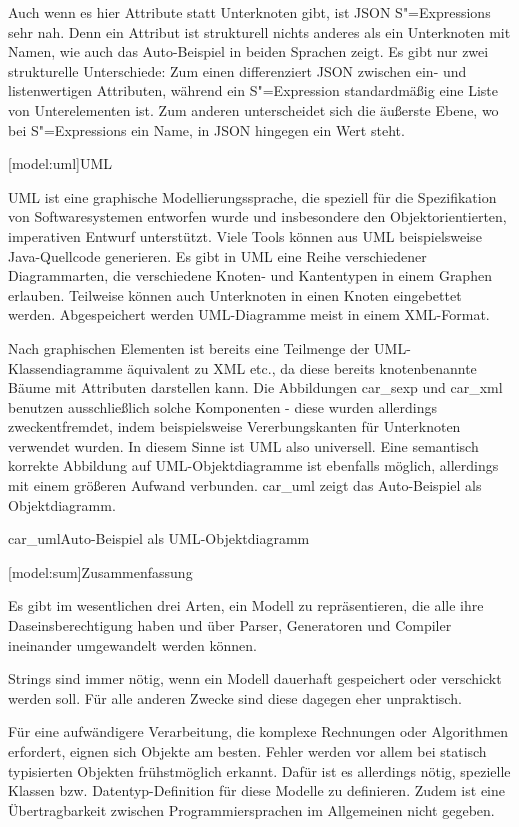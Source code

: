 \documentclass[11pt, a4paper, bibgerm]{book}
\newcommand\lsection{}
\newcommand\fref{}
\newcommand\abb{}
\newcommand\fig{}
\newcommand{\sexp}{S"=Expression}
\newcommand{\sexps}{S"=Expressions}
\begin{document}
Auch wenn es hier Attribute statt Unterknoten gibt, ist JSON \sexps{}
sehr nah. Denn ein Attribut ist strukturell nichts anderes als ein
Unterknoten mit Namen, wie auch das Auto-Beispiel in beiden Sprachen
zeigt. Es gibt nur zwei strukturelle Unterschiede: Zum einen
differenziert JSON zwischen ein- und listenwertigen Attributen, während
ein \sexp{} standardmäßig eine Liste von Unterelementen ist. Zum anderen
unterscheidet sich die äußerste Ebene, wo bei \sexps{} ein Name, in JSON
hingegen ein Wert steht.

\lsection[model:uml]{UML}

UML ist eine graphische Modellierungssprache, die speziell für die
Spezifikation von Softwaresystemen entworfen wurde und insbesondere den
Objektorientierten, imperativen Entwurf unterstützt. Viele Tools können
aus UML beispielsweise Java-Quellcode generieren. Es gibt in UML eine
Reihe verschiedener Diagrammarten, die verschiedene Knoten- und
Kantentypen in einem Graphen erlauben. Teilweise können auch Unterknoten
in einen Knoten eingebettet werden. Abgespeichert werden UML-Diagramme
meist in einem XML-Format.

Nach graphischen Elementen ist bereits eine Teilmenge der
UML-Klassen\-diagramme äquivalent zu XML etc., da diese bereits
knotenbenannte Bäume mit Attributen darstellen kann. Die Abbildungen
\fref{car_sexp} und \fref{car_xml} benutzen ausschließlich solche
Komponenten - diese wurden allerdings zweckentfremdet, indem
beispielsweise Vererbungskanten für Unterknoten verwendet wurden. In
diesem Sinne ist UML also universell. Eine semantisch korrekte Abbildung
auf UML-Objektdiagramme ist ebenfalls möglich, allerdings mit einem
größeren Aufwand verbunden. \abb{car_uml} zeigt das Auto-Beispiel als
Objektdiagramm.

\fig{car_uml}{Auto-Beispiel als UML-Objektdiagramm}

\lsection[model:sum]{Zusammenfassung}

Es gibt im wesentlichen drei Arten, ein Modell zu repräsentieren, die
alle ihre Daseinsberechtigung haben und über Parser, Generatoren und
Compiler ineinander umgewandelt werden können.

Strings sind immer nötig, wenn ein Modell dauerhaft gespeichert oder
verschickt werden soll. Für alle anderen Zwecke sind diese dagegen eher
unpraktisch.

Für eine aufwändigere Verarbeitung, die komplexe Rechnungen oder
Algorithmen erfordert, eignen sich Objekte am besten. Fehler werden vor
allem bei statisch typisierten Objekten frühstmöglich erkannt. Dafür ist
es allerdings nötig, spezielle Klassen bzw. Datentyp-Definition für
diese Modelle zu definieren. Zudem ist eine Übertragbarkeit zwischen
Programmiersprachen im Allgemeinen nicht gegeben.
\end{document}
